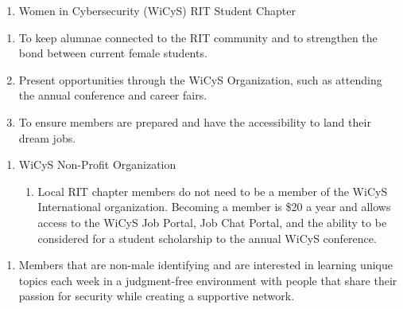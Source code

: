 


\begin{enumerate}
	\item Women in Cybersecurity (WiCyS) RIT Student Chapter
\end{enumerate}


\begin{enumerate}
	\item To keep alumnae connected to the RIT community and to strengthen the bond between current female students.
      \item Present opportunities through the WiCyS Organization, such as attending the annual conference and career fairs. 
      \item To ensure members are prepared and have the accessibility to land their dream jobs. 
\end{enumerate}



\begin{enumerate}
	\item WiCyS Non-Profit Organization
	      \begin{enumerate}
		      \item Local RIT chapter members do not need to be a member of the WiCyS International organization. Becoming a member is \$20 a year and allows access to the WiCyS Job Portal, Job Chat Portal, and the ability to be considered for a student scholarship to the annual WiCyS conference.
            \end{enumerate}
\end{enumerate}


\begin{enumerate}
	\item Members that are non-male identifying and are interested in learning unique topics each week in a judgment-free environment with people that share their passion for security while creating a supportive network.
\end{enumerate}

